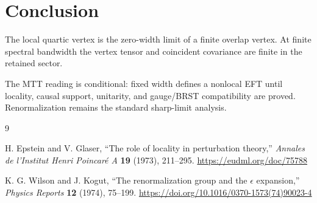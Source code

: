 \documentclass[11pt]{article}
\begin{document}
\section{Conclusion}

The local quartic vertex is the zero-width limit of a finite overlap vertex.  At finite
spectral bandwidth the vertex tensor and coincident covariance are finite in the retained
sector.

The MTT reading is conditional: fixed width defines a nonlocal EFT until locality, causal
support, unitarity, and gauge/BRST compatibility are proved.  Renormalization remains the
standard sharp-limit analysis.

\begin{thebibliography}{9}

H. Epstein and V. Glaser,
``The role of locality in perturbation theory,''
\emph{Annales de l'Institut Henri Poincar\'e A} \textbf{19} (1973), 211--295.
\url{https://eudml.org/doc/75788}

K. G. Wilson and J. Kogut,
``The renormalization group and the \(\epsilon\) expansion,''
\emph{Physics Reports} \textbf{12} (1974), 75--199.
\url{https://doi.org/10.1016/0370-1573(74)90023-4}

\end{thebibliography}
\end{document}
